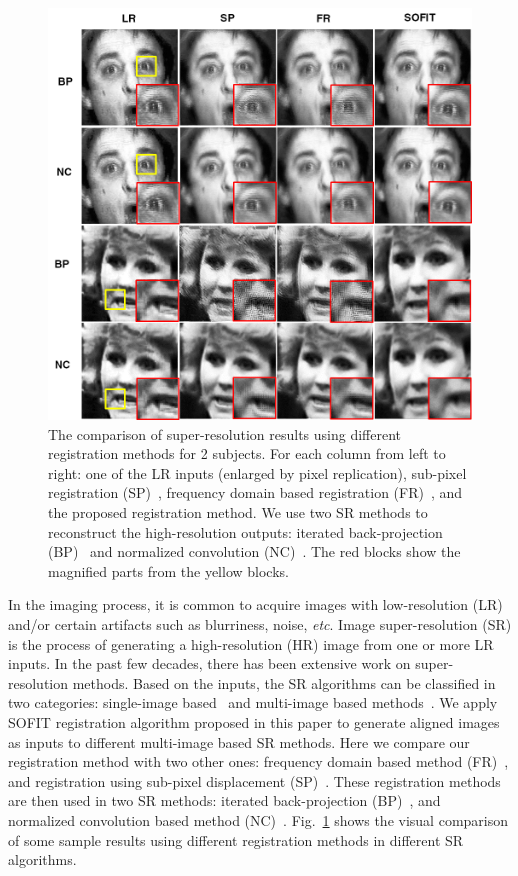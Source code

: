 \documentclass[review]{elsarticle}
\begin{document}
\begin{figure}[t]
	\centering
	\includegraphics[width=\columnwidth]{fig/superResolution.png}
	\caption{The comparison of super-resolution results using different registration methods for 2 subjects. For each column from left to right: one of the LR inputs (enlarged by pixel replication), sub-pixel registration (SP)~\cite{Keren_CVPR88}, frequency domain based registration (FR)~\cite{Vandewalle06}, and the proposed registration method. We use two SR methods to reconstruct the high-resolution outputs: iterated back-projection (BP)~\cite{Irani91} and normalized convolution (NC)~\cite{Pham_06}. The red blocks show the magnified parts from the yellow blocks.}
	\label{fig:superResolution}
\end{figure}



In the imaging process, it is common to acquire images with low-resolution (LR) and/or certain artifacts such as blurriness, noise, \textit{etc}. Image super-resolution (SR) is the process of generating a high-resolution (HR) image from one or more LR inputs. In the past few decades, there has been extensive work on super-resolution methods. Based on the inputs, the SR algorithms can be classified in two categories: single-image based~\cite{Sun_CVPR08} and multi-image based methods~\cite{Irani91}. We apply SOFIT registration algorithm proposed in this paper to generate aligned images as inputs to different multi-image based SR methods. Here we compare our registration method with two other ones: frequency domain based method (FR)~\cite{Vandewalle06}, and registration using sub-pixel displacement (SP)~\cite{Keren_CVPR88}. These registration methods are then used in two SR methods: iterated back-projection (BP)~\cite{Irani91}, and normalized convolution based method (NC)~\cite{Pham_06}. Fig.~\ref{fig:superResolution} shows the visual comparison of some sample results using different registration methods in different SR algorithms.
\end{document}
